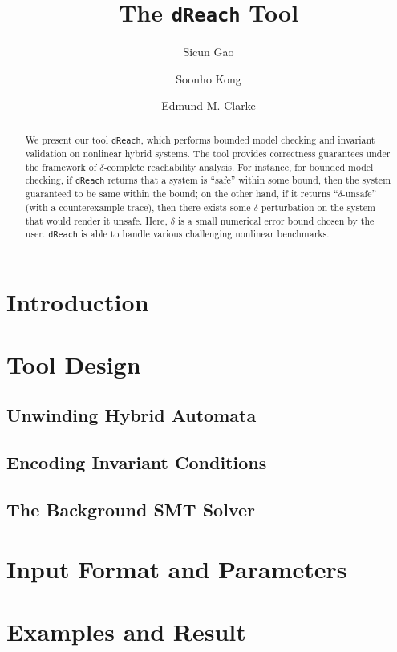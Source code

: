 \documentclass[envcountsect]{llncs}
\title{The {\tt dReach} Tool}
\author{Sicun Gao \and Soonho Kong \and Edmund M. Clarke}
\institute{Carnegie Mellon University, Pittsburgh, PA 15213}
\begin{document}
\maketitle

\begin{abstract}
We present our tool {\tt dReach}, which performs bounded model checking
and invariant validation on nonlinear hybrid systems. The tool provides
correctness guarantees under the framework of $\delta$-complete reachability
analysis. For instance, for bounded model checking, if {\tt dReach} returns that
a system is ``safe'' within some bound, then the system guaranteed to be same
within the bound; on the other hand, if it returns ``$\delta$-unsafe'' (with a
counterexample trace), then there exists some $\delta$-perturbation on the
system that would render it unsafe. Here, $\delta$ is a small numerical error
bound chosen by the user. {\tt dReach} is able to handle various challenging
nonlinear benchmarks. 
\end{abstract}

\section{Introduction}

\section{Tool Design}

\subsection{Unwinding Hybrid Automata}

\subsection{Encoding Invariant Conditions}

\subsection{The Background SMT Solver}

\section{Input Format and Parameters}


\section{Examples and Result}




\end{document}
